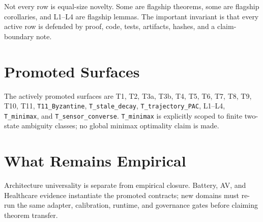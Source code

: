Not every row is equal-size novelty.  Some are flagship theorems, some are
flagship corollaries, and L1--L4 are flagship lemmas.  The important invariant
is that every active row is defended by proof, code, tests, artifacts, hashes,
and a claim-boundary note.

\section{Promoted Surfaces}
The actively promoted surfaces are T1, T2, T3a, T3b, T4, T5, T6, T7, T8, T9,
T10, T11, \texttt{T11\_Byzantine}, \texttt{T\_stale\_decay},
\texttt{T\_trajectory\_PAC}, L1--L4, \texttt{T\_minimax}, and
\texttt{T\_sensor\_converse}.  \texttt{T\_minimax} is explicitly scoped to
finite two-state ambiguity classes; no global minimax optimality claim is made.

\section{What Remains Empirical}
Architecture universality is separate from empirical closure.  Battery, AV,
and Healthcare evidence instantiate the promoted contracts; new domains must
re-run the same adapter, calibration, runtime, and governance gates before
claiming theorem transfer.
